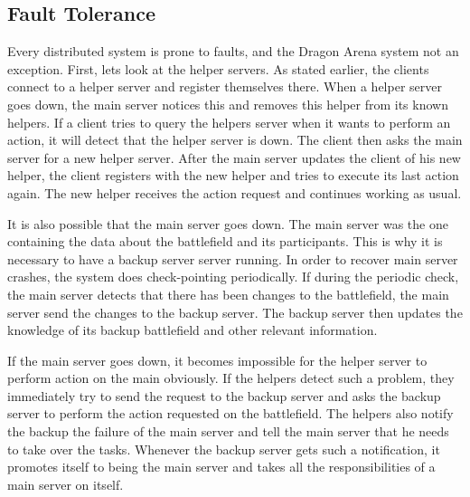 \subsection{Fault Tolerance}
Every distributed system is prone to faults, and the Dragon Arena system not an exception. 
First, lets look at the helper servers. As stated earlier, the clients connect to a helper server and register themselves there.
When a helper server goes down, the main server notices this and removes this helper from its known helpers.
If a client tries to query the helpers server when it wants to perform an action, it will detect that the helper server is down.
The client then asks the main server for a new helper server.
After the main server updates the client of his new helper, the client registers with the new helper and tries to execute its last action again.
The new helper receives the action request and continues working as usual.

It is also possible that the main server goes down. 
The main server was the one containing the data about the battlefield and its participants.
This is why it is necessary to have a backup server server running.  
In order to recover main server crashes, the system does check-pointing periodically.
If during the periodic check, the main server detects that there has been changes to the battlefield, the main server send the changes to the backup server.
The backup server then updates the knowledge of its backup battlefield and other relevant information.

If the main server goes down, it becomes impossible for the helper server to perform action on the main obviously.
If the helpers detect such a problem, they immediately try to send the request to the backup server and asks the backup server to perform the action requested on the battlefield.
The helpers also notify the backup the failure of the main server and tell the main server that he needs to take over the tasks.
Whenever the backup server gets such a notification, it promotes itself to being the main server and takes all the responsibilities of a main server on itself.

